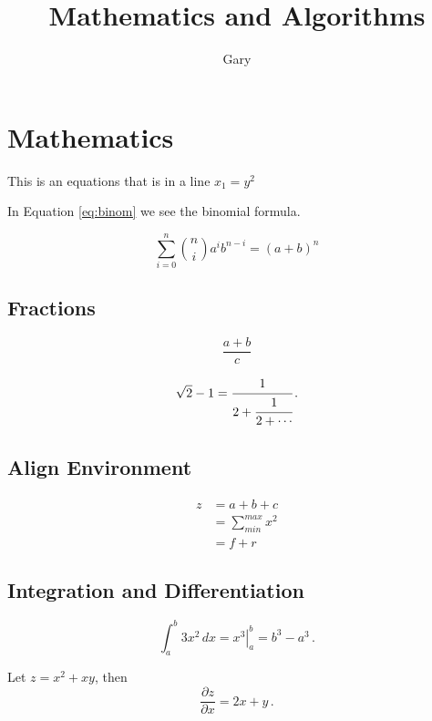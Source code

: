 \documentclass[a4paper, twocolumn]{article}
\title{Mathematics and Algorithms}
\author{Gary}
\begin{document}
\maketitle	

\begin{abstract}
	\lipsum[1]
\end{abstract}

\tableofcontents

\section{Mathematics}
This is an equations that is in a line $x_1 = y^2$

In Equation \ref{eq:binom} we see the binomial formula.  

\begin{equation}
\label{eq:binom}
\sum^{n}_{i=0}
\binom{n}{i}a^{i}b^{n-i}
= (a+b)^{n}
\end{equation}

\subsection{Fractions}

\begin{equation}
\frac{a + b}{c}
\end{equation}

\begin{equation}
\sqrt{2} - 1
= \cfrac{1}{2 +
	\cfrac{1}{2 +
		\dotsb}}\,.
\end{equation}

\subsection{Align Environment}

\begin{align}
z &= a + b + c \\
&= \sum_{min}^{max} x^2 \\
\nonumber
    &= f + r
\end{align}

\subsection{Integration and Differentiation}
\[ \int^{b}_{a}
3 x^{2}\,d x
= \left. x^{3}
\right\rvert^{b}_{a}
= b^{3} - a^{3}\,. \]


Let $z = x^{2} + xy$, then
\[ \frac{\partial z}
{\partial x}
= 2x + y\,. \]
\end{document}

